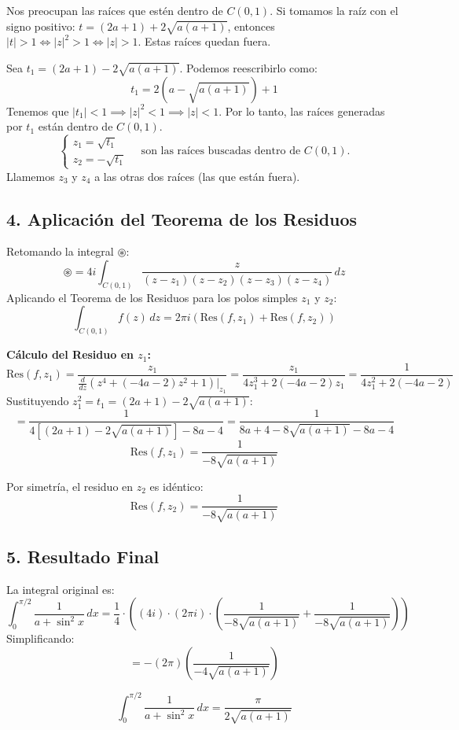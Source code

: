 {Nos preocupan las raíces que estén dentro de $C(0,1)$.
Si tomamos la raíz con el signo positivo: $t = (2a+1) + 2\sqrt{a(a+1)}$, entonces $|t|>1 \iff |z|^2 > 1 \iff |z|>1$. Estas raíces quedan fuera.

Sea $t_1 = (2a+1) - 2\sqrt{a(a+1)}$. Podemos reescribirlo como:
\[
t_1 = 2(a - \sqrt{a(a+1)}) + 1
\]
Tenemos que $|t_1| < 1 \implies |z|^2 < 1 \implies |z| < 1$. Por lo tanto, las raíces generadas por $t_1$ están dentro de $C(0,1)$.
\[
\begin{cases} z_1 = \sqrt{t_1} \\ z_2 = -\sqrt{t_1} \end{cases} \quad \text{son las raíces buscadas dentro de } C(0,1).
\]
Llamemos $z_3$ y $z_4$ a las otras dos raíces (las que están fuera).

\subsection*{4. Aplicación del Teorema de los Residuos}

Retomando la integral $\circledast$:
\[
\circledast = 4i \int_{C(0,1)} \frac{z}{(z-z_1)(z-z_2)(z-z_3)(z-z_4)} \, dz
\]
Aplicando el Teorema de los Residuos para los polos simples $z_1$ y $z_2$:
\[
\int_{C(0,1)} f(z) \, dz = 2\pi i (\text{Res}(f, z_1) + \text{Res}(f, z_2))
\]

\textbf{Cálculo del Residuo en $z_1$:}
\[
\text{Res}(f, z_1) = \frac{z_1}{\frac{d}{dz}(z^4 + (-4a-2)z^2 + 1)\big|_{z_1}} = \frac{z_1}{4z_1^3 + 2(-4a-2)z_1} = \frac{1}{4z_1^2 + 2(-4a-2)}
\]
Sustituyendo $z_1^2 = t_1 = (2a+1) - 2\sqrt{a(a+1)}$:
\[
= \frac{1}{4\left[(2a+1) - 2\sqrt{a(a+1)}\right] - 8a - 4} = \frac{1}{8a + 4 - 8\sqrt{a(a+1)} - 8a - 4}
\]
\[
\text{Res}(f, z_1) = \frac{1}{-8\sqrt{a(a+1)}}
\]

Por simetría, el residuo en $z_2$ es idéntico:
\[
\text{Res}(f, z_2) = \frac{1}{-8\sqrt{a(a+1)}}
\]

\subsection*{5. Resultado Final}

La integral original es:
\[
\int_{0}^{\pi/2} \frac{1}{a+\sin^2 x} \, dx =\frac{1}{4} \cdot(\left( 4i \right) \cdot \left( 2\pi i \right) \cdot \left( \frac{1}{-8\sqrt{a(a+1)}} + \frac{1}{-8\sqrt{a(a+1)}} \right))
\]
Simplificando:
\[
= -(2\pi) \left( \frac{1}{-4\sqrt{a(a+1)}} \right)  
\]

\[
\boxed{ \int_{0}^{\pi/2} \frac{1}{a+\sin^2 x} \, dx =  \frac{\pi}{2\sqrt{a(a+1)}} }
\]
}
